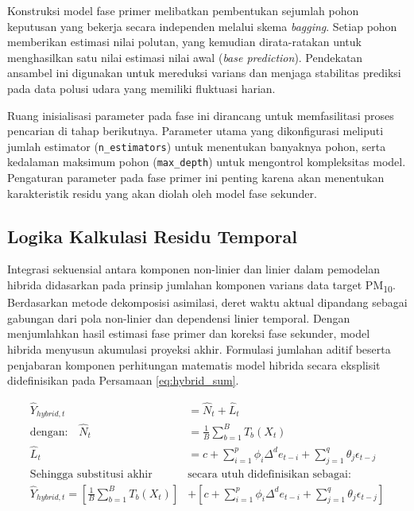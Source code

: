 Konstruksi model fase primer melibatkan pembentukan sejumlah pohon keputusan yang bekerja secara independen melalui skema \textit{bagging}. Setiap pohon memberikan estimasi nilai polutan, yang kemudian dirata-ratakan untuk menghasilkan satu nilai estimasi nilai awal (\textit{base prediction}). Pendekatan ansambel ini digunakan untuk mereduksi varians dan menjaga stabilitas prediksi pada data polusi udara yang memiliki fluktuasi harian.

Ruang inisialisasi parameter pada fase ini dirancang untuk memfasilitasi proses pencarian di tahap berikutnya. Parameter utama yang dikonfigurasi meliputi jumlah estimator (\texttt{n\_estimators}) untuk menentukan banyaknya pohon, serta kedalaman maksimum pohon (\texttt{max\_depth}) untuk mengontrol kompleksitas model. Pengaturan parameter pada fase primer ini penting karena akan menentukan karakteristik residu yang akan diolah oleh model fase sekunder.

\subsection{Logika Kalkulasi Residu Temporal}

Integrasi sekuensial antara komponen non-linier dan linier dalam pemodelan hibrida didasarkan pada prinsip jumlahan komponen varians data target PM\textsubscript{10}. Berdasarkan metode dekomposisi asimilasi, deret waktu aktual dipandang sebagai gabungan dari pola non-linier dan dependensi linier temporal. Dengan menjumlahkan hasil estimasi fase primer dan koreksi fase sekunder, model hibrida menyusun akumulasi proyeksi akhir. Formulasi jumlahan aditif beserta penjabaran komponen perhitungan matematis model hibrida secara eksplisit didefinisikan pada Persamaan \ref{eq:hybrid_sum}.

\begin{equation}
\begin{aligned}
\hat{Y}_{hybrid, t} &= \hat{N}_t + \hat{L}_t \\[2ex]
\text{dengan:} \quad \hat{N}_t &= \frac{1}{B} \sum_{b=1}^{B} T_b(X_t) \\[2ex]
\hat{L}_t &= c + \sum_{i=1}^{p} \phi_i \Delta^d e_{t-i} + \sum_{j=1}^{q} \theta_j \epsilon_{t-j} \\[3ex]
\text{Sehingga substitusi akhir } &\text{secara utuh didefinisikan sebagai:} \\[2ex]
\hat{Y}_{hybrid, t} = \left[ \frac{1}{B} \sum_{b=1}^{B} T_b(X_t) \right] &+ \left[ c + \sum_{i=1}^{p} \phi_i \Delta^d e_{t-i} + \sum_{j=1}^{q} \theta_j \epsilon_{t-j} \right]
\end{aligned}
\label{eq:hybrid_sum}
\end{equation}

